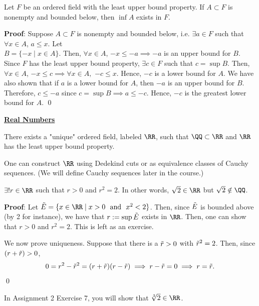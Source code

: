 \begin{theorem}
Let $F$ be an ordered field with the least upper bound property. If $A\subset F$ is nonempty and bounded below, then $\inf A$ exists in $F$.
\end{theorem}
\textbf{Proof}: Suppose $A\subset F$ is nonempty and bounded below, i.e. $\exists a\in F$ such that $\forall x\in A$, $a\leq x$. Let\\ $B = \{-x\mid x\in A\}$. Then, $\forall x\in A$, $-x\leq -a\implies -a$ is an upper bound for $B$. Since $F$ has the least upper bound property, $\exists c\in F$ such that $c = \sup B$. Then, $\forall x\in A$, $-x\leq c\implies \forall x\in A,$ $-c\leq x$. Hence, $-c$ is a lower bound for $A$. We have also shown that if $a$ is a lower bound for $A$, then $-a$ is an upper bound for $B$. Therefore, $c\leq -a$ since $c=\sup B\implies a\leq -c$. Hence, $-c$ is the greatest lower bound for $A$.
\qed 

\noindent \underline{\textbf{Real Numbers}}

\begin{theorem}
There exists a "unique" ordered field, labeled $\RR$, such that $\QQ\subset \RR$ and $\RR$ has the least upper bound property.
\end{theorem}
One can construct $\RR$ using Dedekind cuts or as equivalence classes of Cauchy sequences. (We will define Cauchy sequences later in the course.)

\begin{theorem}
$\exists! r\in \RR$ such that $r>0$ and $r^2 =2$. In other words, $\sqrt 2 \in \RR$ but $\sqrt 2 \notin \QQ$.
\end{theorem}
\textbf{Proof}: Let $\Tilde{E} = \{x\in \RR \mid x>0 \text{~~and~~} x^2<2\}$. Then, since $\Tilde{E}$ is bounded above (by 2 for instance), we have that $r:= \sup\Tilde{E}$ exists in $\RR$. Then, one can show that $r>0$ and $r^2 = 2$. This is left as an exercise.

We now prove uniqueness. Suppose that there is a $\Tilde{r}>0$ with $\Tilde{r}^2 = 2$. Then, since $(r+\Tilde{r})>0$,
\[
0 = r^2 -\Tilde{r}^2 = (r+\Tilde{r})(r-\Tilde{r}) \implies r-\tilde r = 0 \implies r = \Tilde{r}.
\] 
\qed 

\begin{remark}
In Assignment 2 Exercise 7, you will show that $\sqrt[3]2\in \RR$.
\end{remark}


